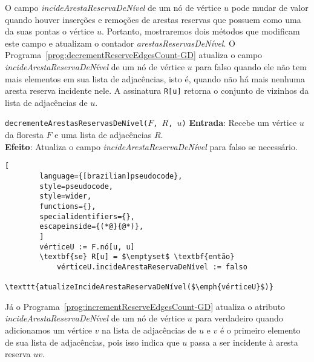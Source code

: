 O campo \textit{incideArestaReservaDeNível} de um nó de vértice $u$ pode mudar de valor quando houver inserções e remoções de arestas reservas que possuem como uma da suas pontas o vértice $u$. Portanto, mostraremos dois métodos que modificam este campo e atualizam o contador \textit{arestasReservasDeNível}. O Programa~\ref{prog:decrementReserveEdgesCount-GD} atualiza o campo \textit{incideArestaReservaDeNível} de um nó de vértice $u$ para falso quando ele não tem mais elementos em sua lista de adjacências, isto é, quando não há mais nenhuma aresta reserva incidente nele. A assinatura \texttt{R[u]} retorna o conjunto de vizinhos da lista de adjacências de $u$.

\begin{programruledcaption}{\texttt{decrementeArestasReservasDeNível($F$, $R$, $u$)} \label{prog:decrementReserveEdgesCount-GD}}
    \noindent\textbf{Entrada}: Recebe um vértice $u$ da floresta $F$ e uma lista de adjacências $R$.\\
    \noindent\textbf{Efeito}: Atualiza o campo \textit{incideArestaReservaDeNível} para falso se necessário.
    \vspace{-0.5\baselineskip}
    \begin{lstlisting}[
        language={[brazilian]pseudocode},
        style=pseudocode,
        style=wider,
        functions={},
        specialidentifiers={},
        escapeinside={(*@}{@*)},
        ]
        vérticeU := F.nó[u, u]
        \textbf{se} R[u] = $\emptyset$ \textbf{então} 
            vérticeU.incideArestaReservaDeNível := falso
            \texttt{atualizeIncideArestaReservaDeNível($\emph{vérticeU}$)}
    \end{lstlisting}
    \vspace{-0.5\baselineskip}
\end{programruledcaption}

Já o Programa~\ref{prog:incrementReserveEdgesCount-GD} atualiza o atributo \textit{incideArestaReservaDeNível} de um nó de vértice $u$ para verdadeiro quando adicionamos um vértice $v$ na lista de adjacências de $u$ e $v$ é o primeiro elemento de sua lista de adjacências, pois isso indica que $u$ passa a ser incidente à aresta reserva $uv$.

